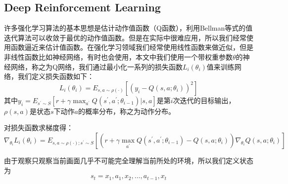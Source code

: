\documentclass{article} %
\begin{document}
\begin{CJK*}{UTF8}{gkai}
\section{Deep Reinforcement Learning}
许多强化学习算法的基本思想是估计动作值函数（Q函数），利用Bellman等式的值迭代算法可以收敛于最优的动作值函数。但是在实际中很难应用，所以我们经常使用函数逼近来估计值函数。在强化学习领域我们经常使用线性函数来做近似，但是非线性函数比如神经网络，有时也会使用，本文中我们使用一个带权重参数$\theta$的神经网络，称之为Q网络，我们通过最小化一系列的损失函数$L _{i} \left(\theta _{i}\right)$值来训练网络，我们定义损失函数如下：
$$L _{i} \left(\theta _{i}\right)=E _{s,a\sim \rho \left(\cdot\right)}\left[\left(y _{i} - Q\left(s,a;\theta _{i}\right)\right) ^{2}\right]$$
其中$y _{i}=E _{s ^{\prime} \sim S}\left[r+\gamma \max _{a ^{\prime}}Q \left(s ^{\prime},a ^{\prime};\theta _{i-1}\right)\vert s,a\right]$是第$i$次迭代的目标输出，$\rho\left(s,a\right)$是状态$s$下动作$a$的概率分布，称之为动作分布。

对损失函数求梯度得：
$$\nabla _{\theta _{i}}L _{i} \left(\theta _{i}\right)=E _{s,a\sim \rho \left(\cdot\right);s ^{\prime} \sim S}\left[\left(r+\gamma \max _{a ^{\prime}}Q \left(s ^{\prime},a ^{\prime};\theta _{i-1}\right) - Q \left(s,a;\theta _{i}\right) \right)\nabla _{\theta _{i}}Q \left(s,a;\theta _{i}\right)\right]$$

由于观察只观察当前画面几乎不可能完全理解当前所处的环境，所以我们定义状态为$$s _{t} = x _{1},a _{1},x _{2},\dots,a _{t-1},x _{t}$$

\end{CJK*}
\end{document}
